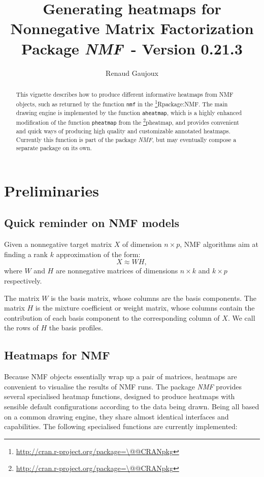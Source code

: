 \documentclass[a4paper]{article}\usepackage[]{graphicx}\usepackage[]{color}
\makeatletter
\let\code=\texttt
\newcommand{\pkgname}[1]{\textit{#1}\xspace}
\newcommand{\CRANurl}[1]{\url{http://cran.r-project.org/package=#1}}
\def\CRANpkg{\@ifstar\@CRANpkg\@@CRANpkg}
\def\@CRANpkg#1{\href{http://cran.r-project.org/package=#1}{\pkgname{#1}}\footnote{\CRANurl{#1}}}
\def\@@CRANpkg#1{\href{http://cran.r-project.org/package=#1}{\pkgname{#1}} package\footnote{\CRANurl{#1}}}
\def\citeCRANpkg{\@ifstar\@citeCRANpkg\@@citeCRANpkg}
\def\@citeCRANpkg#1{\CRANpkg{#1}\cite*{Rpackage:#1}}
\def\@@citeCRANpkg#1{\CRANpkg{#1}~\cite{Rpackage:#1}}
\newcommand{\nmfpack}{\pkgname{NMF}}
\renewcommand{\cite}[1]{\parencite{#1}}
\makeatother
\begin{document}
\title{Generating heatmaps for Nonnegative Matrix Factorization\\
\small Package \nmfpack\ - Version 0.21.3}
\author{Renaud Gaujoux}

\maketitle

\begin{abstract}
This vignette describes how to produce different informative heatmaps from NMF objects, 
such as returned by the function \code{nmf} in the \citeCRANpkg{NMF}.
The main drawing engine is implemented by the function \code{aheatmap}, which is 
a highly enhanced modification of the function \code{pheatmap} from the \CRANpkg{pheatmap},
and provides convenient and quick ways of producing high quality and customizable annotated heatmaps.
Currently this function is part of the package \nmfpack, but may eventually 
compose a separate package on its own.
\end{abstract}

{\small \tableofcontents}

\section{Preliminaries}

\subsection{Quick reminder on NMF models}

Given a nonnegative target matrix $X$ of dimension $n\times p$, NMF algorithms 
aim at finding a rank $k$ approximation of the form:
$$
X \approx W H,
$$
where $W$ and $H$ are nonnegative matrices of dimensions $n\times k$ and $k\times p$ 
respectively.

The matrix $W$ is the basis matrix, whose columns are the basis components.
The matrix $H$ is the mixture coefficient or weight matrix, whose columns contain 
the contribution of each basis component to the corresponding column of $X$.
We call the rows of $H$ the basis profiles.

\subsection{Heatmaps for NMF}

Because NMF objects essentially wrap up a pair of matrices, heatmaps are convenient 
to visualise the results of NMF runs. 
The package \nmfpack provides several specialised heatmap functions, designed to produce 
heatmaps with sensible default configurations according to the data being drawn.
Being all based on a common drawing engine, they share almost identical interfaces 
and capabilities.
The following specialised functions are currently implemented:
\end{document}
